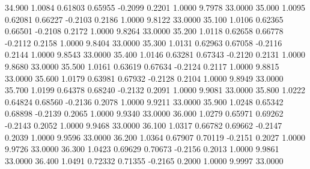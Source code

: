   34.900   1.0084   0.61803   0.65955  -0.2099   0.2201   1.0000   9.7978  33.0000
  35.000   1.0095   0.62081   0.66227  -0.2103   0.2186   1.0000   9.8122  33.0000
  35.100   1.0106   0.62365   0.66501  -0.2108   0.2172   1.0000   9.8264  33.0000
  35.200   1.0118   0.62658   0.66778  -0.2112   0.2158   1.0000   9.8404  33.0000
  35.300   1.0131   0.62963   0.67058  -0.2116   0.2144   1.0000   9.8543  33.0000
  35.400   1.0146   0.63281   0.67343  -0.2120   0.2131   1.0000   9.8680  33.0000
  35.500   1.0161   0.63619   0.67634  -0.2124   0.2117   1.0000   9.8815  33.0000
  35.600   1.0179   0.63981   0.67932  -0.2128   0.2104   1.0000   9.8949  33.0000
  35.700   1.0199   0.64378   0.68240  -0.2132   0.2091   1.0000   9.9081  33.0000
  35.800   1.0222   0.64824   0.68560  -0.2136   0.2078   1.0000   9.9211  33.0000
  35.900   1.0248   0.65342   0.68898  -0.2139   0.2065   1.0000   9.9340  33.0000
  36.000   1.0279   0.65971   0.69262  -0.2143   0.2052   1.0000   9.9468  33.0000
  36.100   1.0317   0.66782   0.69662  -0.2147   0.2039   1.0000   9.9596  33.0000
  36.200   1.0364   0.67907   0.70119  -0.2151   0.2027   1.0000   9.9726  33.0000
  36.300   1.0423   0.69629   0.70673  -0.2156   0.2013   1.0000   9.9861  33.0000
  36.400   1.0491   0.72332   0.71355  -0.2165   0.2000   1.0000   9.9997  33.0000
